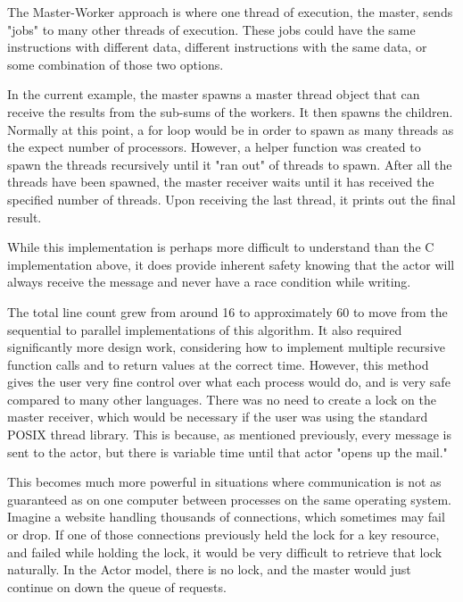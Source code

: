 \documentclass[12pt]{article}
\begin{document}
The Master-Worker approach is where one thread of execution, the master, sends "jobs" to many other threads of execution. These jobs could have the same instructions with different data, different instructions with the same data, or some combination of those two options. 

In the current example, the master spawns a master thread object that can receive the results from the sub-sums of the workers. It then spawns the children. Normally at this point, a for loop would be in order to spawn as many threads as the expect number of processors. However, a helper function was created to spawn the threads recursively until it "ran out" of threads to spawn. After all the threads have been spawned, the master receiver waits until it has received the specified number of threads. Upon receiving the last thread, it prints out the final result.



While this implementation is perhaps more difficult to understand than the C implementation above, it does provide inherent safety knowing that the actor will always receive the message and never have a race condition while writing.

The total line count grew from around 16 to approximately 60 to move from the sequential to parallel implementations of this algorithm. It also required significantly more design work, considering how to implement multiple recursive function calls and to return values at the correct time. However, this method gives the user very fine control over what each process would do, and is very safe compared to many other languages. There was no need to create a lock on the master receiver, which would be necessary if the user was using the standard POSIX thread library. This is because, as mentioned previously, every message is sent to the actor, but there is variable time until that actor "opens up the mail." 

This becomes much more powerful in situations where communication is not as guaranteed as on one computer between processes on the same operating system. Imagine a website handling thousands of connections, which sometimes may fail or drop. If one of those connections previously held the lock for a key resource, and failed while holding the lock, it would be very difficult to retrieve that lock naturally. In the Actor model, there is no lock, and the master would just continue on down the queue of requests.
\end{document}
